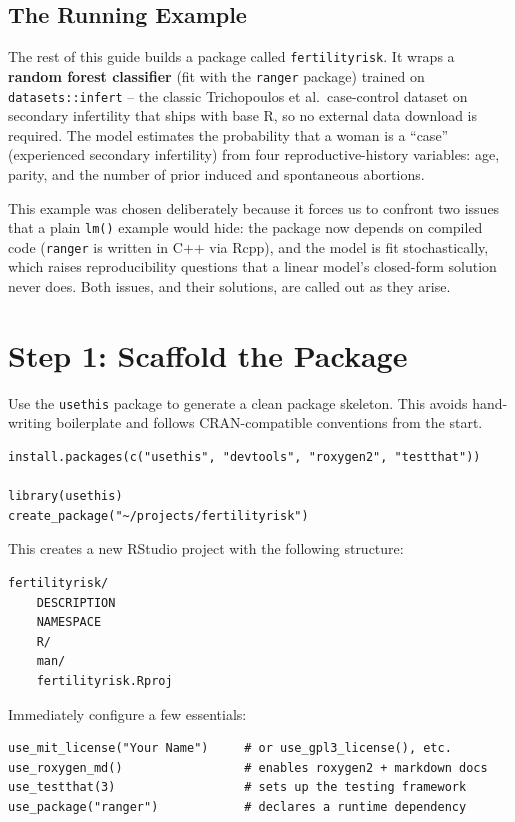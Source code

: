 \documentclass[11pt]{article}
\begin{document}
\subsection*{The Running Example}
The rest of this guide builds a package called \texttt{fertilityrisk}. It wraps a \textbf{random forest classifier} (fit with the \texttt{ranger} package) trained on \texttt{datasets::infert} -- the classic Trichopoulos et al.\ case-control dataset on secondary infertility that ships with base R, so no external data download is required. The model estimates the probability that a woman is a ``case'' (experienced secondary infertility) from four reproductive-history variables: age, parity, and the number of prior induced and spontaneous abortions.

This example was chosen deliberately because it forces us to confront two issues that a plain \texttt{lm()} example would hide: the package now depends on compiled code (\texttt{ranger} is written in C++ via Rcpp), and the model is fit stochastically, which raises reproducibility questions that a linear model's closed-form solution never does. Both issues, and their solutions, are called out as they arise.

\section{Step 1: Scaffold the Package}

Use the \texttt{usethis} package to generate a clean package skeleton. This avoids hand-writing boilerplate and follows CRAN-compatible conventions from the start.

\begin{lstlisting}
install.packages(c("usethis", "devtools", "roxygen2", "testthat"))

library(usethis)
create_package("~/projects/fertilityrisk")
\end{lstlisting}

This creates a new RStudio project with the following structure:

\begin{lstlisting}[language={}]
fertilityrisk/
    DESCRIPTION
    NAMESPACE
    R/
    man/
    fertilityrisk.Rproj
\end{lstlisting}

Immediately configure a few essentials:

\begin{lstlisting}
use_mit_license("Your Name")     # or use_gpl3_license(), etc.
use_roxygen_md()                 # enables roxygen2 + markdown docs
use_testthat(3)                  # sets up the testing framework
use_package("ranger")            # declares a runtime dependency
\end{lstlisting}
\end{document}
